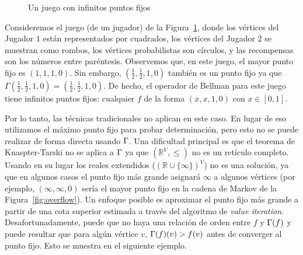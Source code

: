 \begin{figure}
\centering
{}
\caption{Un juego con infinitos puntos fijos} \label{fig:multiple-fixpoints}
\end{figure}

\begin{example}\label{ex:several-fixpoints} Consideremos el juego (de un jugador) de la Figura~\ref{fig:multiple-fixpoints}, donde los vértices del Jugador $1$ están representados por cuadrados, los vértices del Jugador $2$ se muestran como rombos, los vértices probabilistas son círculos, y las recompensas son los números entre paréntesis. Observemos que, en este juego, el mayor punto fijo es $(1,1,1,0)$.  Sin embargo, $(\frac{1}{2},\frac{1}{2},1,0)$ también es un punto fijo ya que $\Gamma(\frac{1}{2},\frac{1}{2},1,0) = (\frac{1}{2},\frac{1}{2},1,0)$.  De hecho, el operador de Bellman para este juego tiene infinitos puntos fijos: cualquier $f$ de la forma $(x,x,1,0)$ con $x\in[0,1]$.
\end{example}

Por lo tanto, las técnicas tradicionales no aplican en este caso. En lugar de eso utilizamos el máximo punto fijo para probar determinación, pero esto no se puede realizar de forma directa usando $\Gamma$. Una dificultad principal es que el teorema de Knaspter-Tarski no se aplica a $\Gamma$ ya que $(\mathbb{R}^V, \leq)$ no es un retículo completo. Usando en su lugar los reales extendidos ($(\mathbb{R} \cup \{\infty\})^V$) no es una solución, ya que en algunos casos el punto fijo más grande asignará $\infty$ a algunos vértices (por ejemplo, $(\infty,\infty,0)$ sería el mayor punto fijo en la cadena de Markov de la Figura~\ref{fig:overflow}).
Un enfoque posible es aproximar el punto fijo más grande a partir de una cota superior estimada a través del algoritmo de \emph{value iteration}. Desafortunadamente, puede que no haya una relación de orden entre $f$ y $\Gamma(f)$ y puede resultar que para algún vértice $v$, $\Gamma(f)(v)>f(v)$ antes de converger al punto fijo. Esto se muestra en el siguiente ejemplo.

